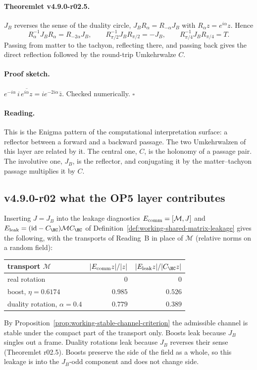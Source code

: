 \paragraph{Theoremlet v4.9.0-r02.5.}
\(J_B\) reverses the sense of the duality circle, \(J_BR_\alpha=R_{-\alpha}J_B\) with \(R_\alpha z=e^{i\alpha}z\).  Hence
\[
R_\alpha^{-1}J_BR_\alpha=R_{-2\alpha}J_B,
\qquad
R_{\pi/2}^{-1}J_BR_{\pi/2}=-J_B,
\qquad
R_{\pi/4}^{-1}J_BR_{\pi/4}=T .
\]
Passing from matter to the tachyon, reflecting there, and passing back gives the direct reflection followed by the
round-trip Umkehrwalze \(C\).

\paragraph{Proof sketch.}
\(e^{-i\alpha}\,i\,\overline{e^{i\alpha}z}=ie^{-2i\alpha}\bar z\).  Checked numerically.  \(\square\)

\paragraph{Reading.}
This is the Enigma pattern of the computational interpretation surface: a reflector between a forward and a backward
passage.  The two Umkehrwalzen of this layer are related by it.  The central one, \(C\), is the holonomy of a passage
pair.  The involutive one, \(J_B\), is the reflector, and conjugating it by the matter--tachyon passage multiplies it by
\(C\).

\subsection*{v4.9.0-r02 what the OP5 layer contributes}
\label{subsec:v490-r02-op5}

Inserting \(J=J_B\) into the leakage diagnostics \(E_{\rm comm}=[\mathcal M,J]\) and
\(E_{\rm leak}=(\mathrm{id}-C_{\HC})\mathcal MC_{\HC}\) of Definition~\ref{def:working-shared-matrix-leakage} gives the
following, with the transports of Reading~B in place of \(\mathcal M\) (relative norms on a random field):
\begin{center}
\small
\begin{tabular}{@{}lrr@{}}
\toprule
transport \(\mathcal M\) & \(|E_{\rm comm}z|/|z|\) & \(|E_{\rm leak}z|/|C_{\HC}z|\)\\
\midrule
real rotation & \(0\) & \(0\)\\
boost, \(\eta=0.6174\) & \(0.985\) & \(0.526\)\\
duality rotation, \(\alpha=0.4\) & \(0.779\) & \(0.389\)\\
\bottomrule
\end{tabular}
\end{center}
By Proposition~\ref{prop:working-stable-channel-criterion} the admissible channel is stable under the compact part of
the transport only.  Boosts leak because \(J_B\) singles out a frame.  Duality rotations leak because \(J_B\) reverses
their sense (Theoremlet r02.5).  Boosts preserve the side of the field as a whole, so this leakage is into the
\(J_B\)-odd component and does not change side.

